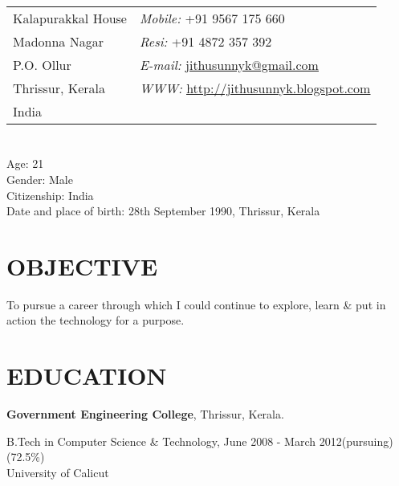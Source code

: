 \begin{resume}


\section{}
\vspace{.05in}
\begin{tabular}{@{}p{2in}p{4in}}
Kalapurakkal House   & {\it Mobile:}  +91 9567 175 660 \\
Madonna Nagar   & {\it Resi:}    +91 4872 357 392   \\
P.O. Ollur & {\it E-mail:}
\href{mailto:jithusunnyk@gmail.com}{\underline{jithusunnyk@gmail.com}}
\\
Thrissur, Kerala  & {\it WWW:}
\href{http://jithusunnyk.blogspot.com}{\underline{http://jithusunnyk.blogspot.com}}
 \\
India
\end{tabular}

\vspace*{+3.5mm}
\section{}
Age: 21\\
Gender: Male\\
Citizenship: India\\
Date and place of birth: 28th September 1990, Thrissur, Kerala \\

\vspace*{+3.5mm}

\section{\bf \textsf{OBJECTIVE}}
To pursue a career through which I could continue to explore, learn \& put in action the technology for a purpose.

\vspace*{+3.5mm}

\section{\bf \textsf{EDUCATION}}
{\bf \textsf{Government Engineering College}}, Thrissur, Kerala.\\
\vspace*{-.1in}

\begin{list1}
\item[] B.Tech in Computer Science \& Technology, June 2008 - March 2012(pursuing)  \qquad (72.5\%)\\ University of Calicut 
\end{list1}


\end{resume}
